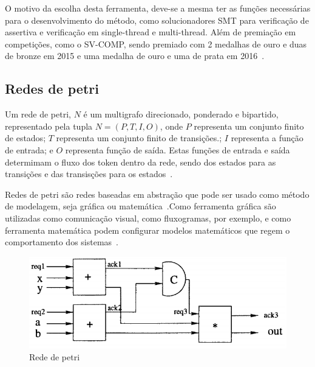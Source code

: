 
\par
O motivo da escolha desta ferramenta, deve-se a mesma ter as funções necessárias para o desenvolvimento do método, como solucionadores SMT para verificação de assertiva e verificação em single-thread e multi-thread. Além de premiação em competições, como o SV-COMP, sendo premiado com 2 medalhas de ouro e duas de bronze em 2015 e uma medalha de ouro e uma de prata em 2016~\cite{esbmc}.
\subsection{Redes de petri}
\par
Um rede de petri, $N$ é um multigrafo direcionado, ponderado e bipartido, representado pela tupla $N=(P,T,I,O)$, onde $P$ representa um conjunto finito de estados; $T$ representa um conjunto finito de transições.; $I$ representa a função de entrada; e $O$ representa função de saída. Estas funções de entrada e saída determimam o fluxo dos token dentro da rede, sendo dos estados para as transições e das transisções para os estados~\cite{halder2006}.


Redes de petri são redes baseadas em abstração que pode ser usado como método de modelagem, seja gráfica ou matemática~\cite{halder2006}.Como ferramenta gráfica são utilizadas como comunicação visual, como fluxogramas, por exemplo, e como ferramenta matemática podem configurar modelos matemáticos que regem o comportamento dos sistemas~\cite{murata1989petri}. 

\begin{figure}[H]
	\begin{center}
    \caption{\label{fig:circuito_petri}Rede de petri}
	\includegraphics[scale=0.50]{Figuras/Circuito_rede_petri.png}
	\end{center}
\end{figure}

